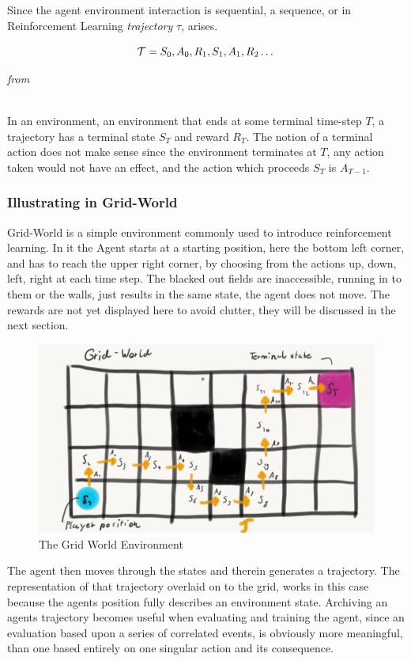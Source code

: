 \noindent
Since the agent environment interaction is sequential, a sequence, or in Reinforcement Learning \textit{trajectory} $\tau$, arises. 

\begin{equation}\label{MDP:trajectory}
    \mathcal{T} = S_0, A_0, R_1, S_1, A_1, R_2 \dots
\end{equation}
\centerline{\small\textit{from }}

\noindent
\\ In an  environment, an environment that ends at some terminal time-step $T$, a trajectory has a terminal state $S_T$ and reward $R_T$. The notion of a terminal action does not make sense since the environment terminates at $T$, any action taken would not have an effect, and the action which proceeds $S_T$ is $A_{T-1}$.

\subsubsection{Illustrating in Grid-World}\label{subsubsec:grid_world_trajectory}
Grid-World is a simple environment commonly used to introduce reinforcement learning. In it the Agent starts at a starting position, here the bottom left corner, and has to reach the upper right corner, by choosing from the actions up, down, left, right at each time step. The blacked out fields are inaccessible, running in to them or the walls, just results in the same state, the agent does not move. The rewards are not yet displayed here to avoid clutter, they will be discussed in the next section.

\begin{figure}[h!]
    \centering
    \includegraphics[width=0.7\linewidth]{figures/Grid_world_trajectory.jpeg}
    \caption{The Grid World Environment}
    \label{fig:grid_world}
\end{figure}

\noindent
The agent then moves through the states and therein generates a trajectory. The representation of that trajectory overlaid on to the grid, works in this case because the agents position fully describes an environment state. Archiving an agents trajectory becomes useful when evaluating and training the agent, since an evaluation based upon a series of correlated events, is obviously more meaningful, than one based entirely on one singular action and its consequence.

